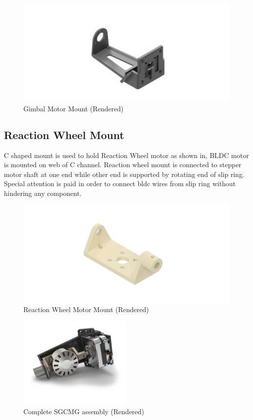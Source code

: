 \begin{figure}[ht]
    \centering
    \includegraphics[width=\textwidth]{figures/Assembly/STP_MOUNT.pdf}
    \caption{Gimbal Motor Mount (Rendered)}
    \label{fig:GMBL_MNT}
\end{figure}

\subsection{Reaction Wheel Mount}
C shaped mount is used to hold Reaction Wheel motor as shown in, BLDC motor is mounted on web of C channel. Reaction wheel mount is connected to stepper motor shaft at one end while other end is supported by rotating end of slip ring. Special attention is paid in order to connect \acrshort{bldc} wires from slip ring without hindering any component. 

\begin{figure}[ht]
    \centering
    \includegraphics[width=\textwidth]{figures/Assembly/rwMount.pdf}
    \caption{Reaction Wheel Motor Mount (Rendered)}
    \label{fig:RW_MNT}
\end{figure}

\begin{figure}[ht]
    \centering
    \includegraphics[width=0.5\textwidth]{figures/Assembly/sgcmg2.pdf}
    \caption{Complete SGCMG assembly (Rendered)}
    \label{fig:SGCMG_ASM}
\end{figure}

